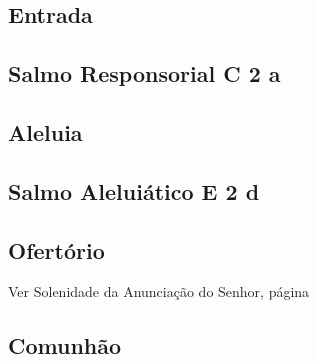
\subsection{Entrada}\label{subsection:proprium-sanctorum/in-conceptione-immaculata-bmv/psalmi-ad-introitum}

\AllowPageFlush

\subsection[Salmo Responsorial]{Salmo Responsorial \textmd{C 2 a}}\label{subsection:proprium-sanctorum/in-conceptione-immaculata-bmv/psalmus-responsorius}

\AllowPageFlush

\subsection{Aleluia}\label{subsection:proprium-sanctorum/in-conceptione-immaculata-bmv/alleluia}

\AllowPageFlush

\subsection[Salmo Aleluiático]{Salmo Aleluiático \textmd{E 2 d}}\label{subsection:proprium-sanctorum/in-conceptione-immaculata-bmv/psalmus-alleluiaticus}

\AllowPageFlush

\subsection{Ofertório}\label{subsection:proprium-sanctorum/in-conceptione-immaculata-bmv/psalmi-ad-offertorium}

\begin{rubrica}
  Ver Solenidade da Anunciação do Senhor, pági\-na~\pageref{subsection:proprium-sanctorum/in-annuntiatione-domini/psalmi-ad-offertorium}
\end{rubrica}

\AllowPageFlush

\subsection{Comunhão}\label{subsection:proprium-sanctorum/in-conceptione-immaculata-bmv/psalmi-ad-communionem}

